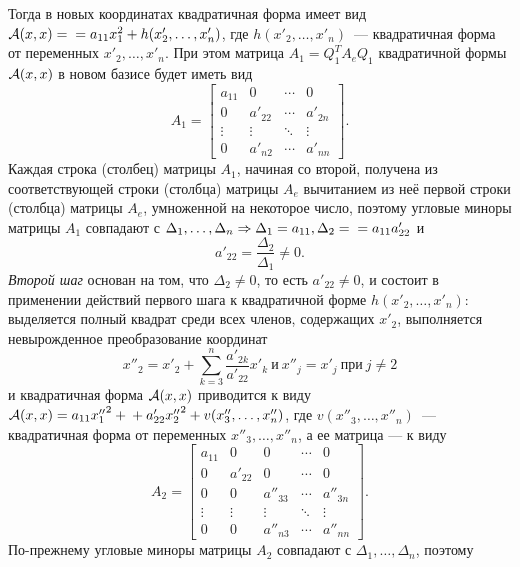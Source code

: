 \begin{proofocre}
\begin{enumerate}
\begin{equation}
    \end{equation}
    Тогда в новых координатах квадратичная форма имеет вид ${\mathcal{A}}(x,x)=\\=a_{11}x_1^2+h(x'_2,\ldots,x'_n)$, где $h(x'_2,\ldots,x'_n)$~--- квадратичная форма от переменных $x'_2,\ldots,x'_n$. При этом матрица $A_1=Q_1^TA_eQ_1$ квадратичной формы ${\mathcal{A}}(x,x)$ в новом базисе будет иметь вид
    $$A_1=
    \begin{bmatrix}
        a_{11} & 0 & \cdots & 0\\
        0 & a'_{22} & \cdots & a'_{2n}\\
        \vdots & \vdots & \ddots & \vdots\\
        0 & a'_{n2} & \cdots & a'_{nn}
    \end{bmatrix}.$$
    Каждая строка (столбец) матрицы $A_1$, начиная со второй, получена из соответствующей строки (столбца) матрицы $A_e$ вычитанием из неё первой строки (столбца) матрицы $A_e$, умноженной на некоторое число, поэтому угловые миноры матрицы $A_1$ совпадают с $\Delta_1,\ldots,\Delta_n \Rightarrow \Delta_1=a_{11},\Delta_2=\\=a_{11}a'_{22}$ и
    \begin{equation}
    \label{eq a22}
        a'_{22}=\frac{\Delta_2}{\Delta_1}\neq 0.
    \end{equation}
    \emph{Второй шаг} основан на том, что $\Delta_2\neq 0$, то есть $a'_{22}\neq 0$, и состоит в применении действий первого шага к квадратичной форме $h(x'_2,\ldots,x'_n)$: выделяется полный квадрат среди всех членов, содержащих $x'_2$, выполняется невырожденное преобразование координат
    $$x''_2=x'_2+\sum_{k=3}^n\frac{a'_{2k}}{a'_{22}}x'_k~\text{и}~x''_j=x'_j~\text{при}~j\neq 2$$
    и квадратичная форма ${\mathcal{A}}(x,x)$ приводится к виду ${\mathcal{A}}(x,x)=a_{11}{x_1''}^2+\\+a'_{22}{x_2''}^2+v(x''_3,\ldots,x''_n)$, где $v(x''_3,\ldots,x''_n)$~--- квадратичная форма от переменных $x''_3,\ldots,x''_n$, а ее матрица --- к виду
    $$A_2=
    \begin{bmatrix}
        a_{11} & 0 & 0 & \cdots & 0\\
        0 & a'_{22} & 0 & \cdots & 0\\
        0 & 0 & a''_{33} & \cdots & a''_{3n}\\
        \vdots & \vdots & \vdots & \ddots & \vdots\\
        0 & 0 & a''_{n3} & \cdots & a''_{nn}
    \end{bmatrix}.$$
    По-прежнему угловые миноры матрицы $A_2$ совпадают с $\Delta_1,\ldots,\Delta_n$, поэтому

\end{enumerate}
\end{proofocre}
